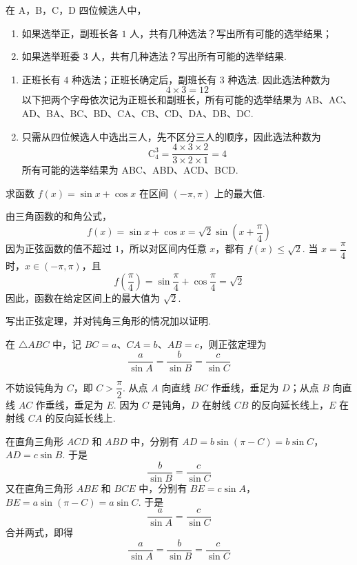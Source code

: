 \documentclass[UTF8,a4paper,oneside,11pt]{ctexbook}
\begin{document}
\begin{problem}
在 A，B，C，D 四位候选人中，

\begin{enumerate}
\item 如果选举正，副班长各 \(1\text{ 人}\)，共有几种选法？写出所有可能的选举结果；
\item 如果选举班委 \(3\text{ 人}\)，共有几种选法？写出所有可能的选举结果.
\end{enumerate}
\end{problem}

\begin{solution}
\begin{enumerate}
\item 正班长有 \(4\) 种选法；正班长确定后，副班长有 \(3\) 种选法. 因此选法种数为
\[
4\times3=12
\]
以下把两个字母依次记为正班长和副班长，所有可能的选举结果为 AB、AC、AD、BA、BC、BD、CA、CB、CD、DA、DB、DC.
\item 只需从四位候选人中选出三人，先不区分三人的顺序，因此选法种数为
\[
\mathrm C_4^3=\frac{4\times3\times2}{3\times2\times1}=4
\]
所有可能的选举结果为 ABC、ABD、ACD、BCD.
\end{enumerate}
\end{solution}

\begin{problem}
求函数 \(f(x)=\sin x+\cos x\) 在区间 \((-\pi,\pi)\) 上的最大值.
\end{problem}

\begin{solution}
由三角函数的和角公式，
\[
f(x)=\sin x+\cos x=\sqrt{2}\sin\left(x+\frac{\pi}{4}\right)
\]
因为正弦函数的值不超过 \(1\)，所以对区间内任意 \(x\)，都有 \(f(x)\le\sqrt{2}\). 当 \(x=\dfrac{\pi}{4}\) 时，\(x\in(-\pi,\pi)\)，且
\[
f\left(\frac{\pi}{4}\right)=\sin\frac{\pi}{4}+\cos\frac{\pi}{4}=\sqrt{2}
\]
因此，函数在给定区间上的最大值为 \(\sqrt{2}\).
\end{solution}

\begin{problem}
写出正弦定理，并对钝角三角形的情况加以证明.
\end{problem}

\begin{solution}
在 \(\triangle ABC\) 中，记 \(BC=a\)、\(CA=b\)、\(AB=c\)，则正弦定理为
\[
\frac{a}{\sin A}=\frac{b}{\sin B}=\frac{c}{\sin C}
\]

不妨设钝角为 \(C\)，即 \(C>\dfrac{\pi}{2}\). 从点 \(A\) 向直线 \(BC\) 作垂线，垂足为 \(D\)；从点 \(B\) 向直线 \(AC\) 作垂线，垂足为 \(E\). 因为 \(C\) 是钝角，\(D\) 在射线 \(CB\) 的反向延长线上，\(E\) 在射线 \(CA\) 的反向延长线上.

在直角三角形 \(ACD\) 和 \(ABD\) 中，分别有
\(AD=b\sin(\pi-C)=b\sin C\)，\(AD=c\sin B\).
于是
\[
\frac{b}{\sin B}=\frac{c}{\sin C}
\]
又在直角三角形 \(ABE\) 和 \(BCE\) 中，分别有
\(BE=c\sin A\)，\(BE=a\sin(\pi-C)=a\sin C\).
于是
\[
\frac{a}{\sin A}=\frac{c}{\sin C}
\]
合并两式，即得
\[
\frac{a}{\sin A}=\frac{b}{\sin B}=\frac{c}{\sin C}
\]
\end{solution}
\end{document}
